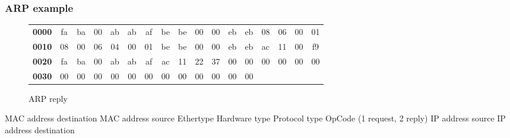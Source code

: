   \begin{frame}
    \frametitle{ARP example}
      \begin{figure}
      \centering
      \resizebox{11.5cm}{!} {
        \begin{tabular}{lcccccccccccccccc}
          \textbf{0000} & \color{red}fa & \color{red}ba & \color{red}00 & \color{red}ab & \color{red}ab & \color{red}af & \color{Marroon}be & \color{Marroon}be & \color{Marroon}00 & \color{Marroon}00 & \color{Marroon}eb & \color{Marroon}eb & \color{blue}08 & \color{blue}06 & \color{magenta}00 & \color{magenta}01 \\
          \textbf{0010} & \color{OliveGreen}08 & \color{OliveGreen}00 & \color{gray}06 & \color{gray}04 & \color{fuchsia}00 & \color{fuchsia}01 & \color{Marroon}be & \color{Marroon}be & \color{Marroon}00 & \color{Marroon}00 & \color{Marroon}eb & \color{Marroon}eb & \color{brown}ac & \color{brown}11 & \color{brown}00 & \color{brown}f9 \\
          \textbf{0020} & \color{red}fa & \color{red}ba & \color{red}00 & \color{red}ab & \color{red}ab & \color{red}af & \color{orange}ac & \color{orange}11 & \color{orange}22 & \color{orange}37 & 00 & 00 & 00 & 00 & 00 & 00 \\
          \textbf{0030} & 00 & 00 & 00 & 00 & 00 & 00 & 00 & 00 & 00 & 00 & 00 & 00 \\
        \end{tabular}
      }
      \caption{ARP reply}
      \label{fig:arp_rep_ex-colored}
    \end{figure}
    \color{red}MAC address destination \color{Marroon}MAC address source \color{blue}Ethertype \color{magenta}Hardware type \color{OliveGreen}Protocol type \color{fuchsia}OpCode (1 request, 2 reply) \color{brown} IP address source \color{orange} IP address destination
  \end{frame}